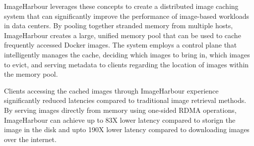 ImageHarbour leverages these concepts to create a distributed image caching system that can significantly improve the performance of image-based workloads in data centers. By pooling together stranded memory from multiple hosts, ImageHarbour creates a large, unified memory pool that can be used to cache frequently accessed Docker images. The system employs a control plane that intelligently manages the cache, deciding which images to bring in, which images to evict, and serving metadata to clients regarding the location of images within the memory pool.

Clients accessing the cached images through ImageHarbour experience significantly reduced latencies compared to traditional image retrieval methods. By serving images directly from memory using one-sided RDMA operations, ImageHarbour can achieve up to 83X lower latency compared to storign the image in the disk and upto 190X lower latency compared to downloading images over the internet.
